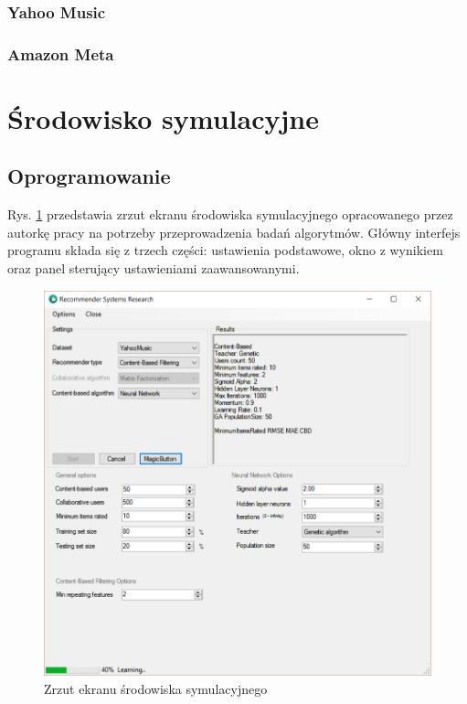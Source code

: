 \documentclass[twoside]{iisthesis}
\begin{document}
		\subsubsection{Yahoo Music}
		
		
		\subsubsection{Amazon Meta}
		
		
			\cite{leskovec2007dynamics}
		
	\section{Środowisko symulacyjne}
	
		\subsection{Oprogramowanie}
	
		Rys. \ref{fig:program} przedstawia zrzut ekranu środowiska symulacyjnego opracowanego przez autorkę pracy na potrzeby przeprowadzenia badań algorytmów. Główny interfejs programu składa się z trzech części: ustawienia podstawowe, okno z wynikiem oraz panel sterujący ustawieniami zaawansowanymi. 
	
		\begin{figure}[!ht] 
			\centering
			\includegraphics[width=1\textwidth]{program}
			\caption{Zrzut ekranu środowiska symulacyjnego}
			\label{fig:program}
		\end{figure}
	
\end{document}
